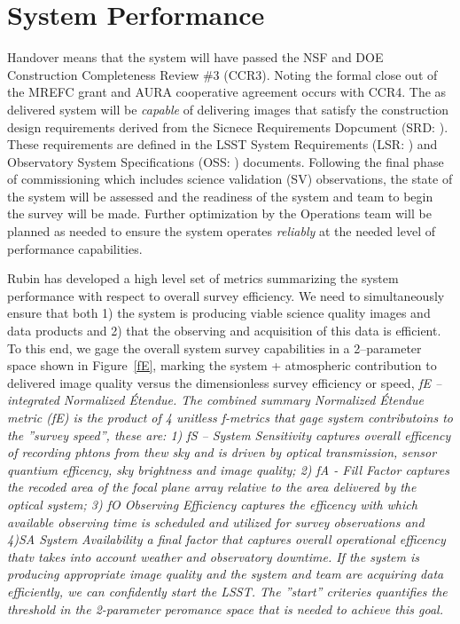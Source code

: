 \section{System Performance}{\label{secSysperf}}
  
Handover means that the system will have passed the NSF and DOE Construction Completeness Review \#3 (CCR3).  Noting the formal close out of the MREFC grant and AURA cooperative agreement occurs with CCR4. The as delivered system will be {\it capable} of delivering images that satisfy the construction design requirements derived from the Sicnece Requirements Dopcument (SRD: \cite{LPM-17}).  These requirements are defined in the LSST System Requirements (LSR: \cite{LSE-29)}) and Observatory System Specifications (OSS: \cite{LSE-30}) documents. Following the final phase of commissioning which includes science validation (SV) observations, the state of the system will be assessed and the readiness of the system and team to begin the survey will be made. Further optimization by the Operations team will be planned as needed to ensure the system operates {\it reliably} at the needed level of performance capabilities. 

Rubin has developed a high level set of metrics summarizing the system performance with respect to overall survey efficiency. We need to simultaneously ensure that both 1) the system is producing viable science quality images and data products and 2) that the observing and acquisition of this data is efficient.  To this end, we gage the overall system survey capabilities in a 2--parameter space shown in Figure~\ref{fE}, marking the system + atmospheric contribution to delivered image quality versus the dimensionless survey efficiency or speed, \it{fE} -- integrated Normalized \'{E}tendue.  The combined summary Normalized \'{E}tendue metric (\it{fE}) is the product of 4 unitless f-metrics that gage system contributoins to the ''survey speed'', these are: 1)  \it{fS -- System Sensitivity} captures overall efficency of recording phtons from thew sky and is driven by optical transmission, sensor quantium efficency, sky brightness and image quality; 2) \it{fA - Fill Factor} captures the recoded area of the focal plane array relative to the area delivered by the optical system; 3) \it{fO Observing Efficiency} captures the efficency with which available observing time is scheduled and utilized for survey observations and 4)\it{SA System Availability} a final factor that captures overall operational efficency thatv takes into account weather and observatory downtime.   If the system is producing appropriate image quality and the system and team are acquiring data efficiently, we can confidently start the LSST.  The ''start'' criteries quantifies the threshold in the 2-parameter peromance space that is needed to achieve this goal.


